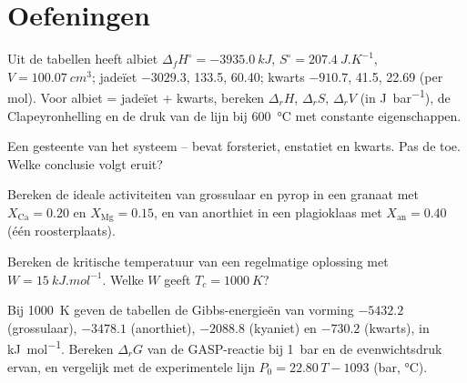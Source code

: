\section{Oefeningen}

\begin{exercise}[$\star$]\label{exo:b3:petrological-thermodynamics:1}
Uit de tabellen heeft albiet $\Delta_fH^\circ = \qty{-3935.0}{kJ}$, $S^\circ =
\qty{207.4}{J.K^{-1}}$, $V = \qty{100.07}{cm^3}$; jadeïet $-3029.3$, 133.5,
60.40; kwarts $-910.7$, 41.5, 22.69 (per mol). Voor albiet = jadeïet + kwarts,
bereken $\Delta_rH$, $\Delta_rS$, $\Delta_rV$ (in \unit{J.bar^{-1}}), de
Clapeyronhelling en de druk van de lijn bij \qty{600}{\celsius} met
constante eigenschappen.
\end{exercise}

\begin{exercise}[$\star$]\label{exo:b3:petrological-thermodynamics:2}
Een gesteente van het systeem -- bevat forsteriet, enstatiet en
kwarts. Pas de  toe. Welke conclusie volgt eruit?
\end{exercise}

\begin{exercise}[$\star$]\label{exo:b3:petrological-thermodynamics:3}
Bereken de ideale activiteiten van grossulaar en pyrop in een granaat met
$X_{\text{Ca}} = 0.20$ en $X_{\text{Mg}} = 0.15$, en van anorthiet in een
plagioklaas met $X_{\text{an}} = 0.40$ (één roosterplaats).
\end{exercise}

\begin{exercise}[$\star$]\label{exo:b3:petrological-thermodynamics:4}
Bereken de kritische temperatuur van een regelmatige oplossing met $W =
\qty{15}{kJ.mol^{-1}}$. Welke $W$ geeft $T_c = \qty{1000}{K}$?
\end{exercise}

\begin{exercise}[$\star\star$]\label{exo:b3:petrological-thermodynamics:5}
Bij \qty{1000}{K} geven de tabellen de Gibbs-energieën van vorming
$-5432.2$ (grossulaar), $-3478.1$ (anorthiet), $-2088.8$ (kyaniet) en $-730.2$
(kwarts), in \unit{kJ.mol^{-1}}. Bereken $\Delta_rG$ van de GASP-reactie bij
\qty{1}{bar} en de evenwichtsdruk ervan, en vergelijk met de experimentele
lijn $P_0 = 22.80\,T - 1093$ (bar, \unit{\celsius}).
\end{exercise}

